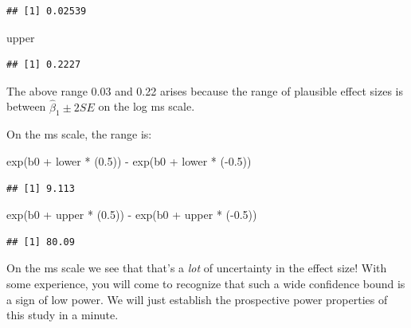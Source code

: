 \documentclass[
  12pt,
]{krantz}
\newenvironment{Shaded}{\begin{snugshade}}{\end{snugshade}}
\newcommand{\FloatTok}[1]{\textcolor[rgb]{0.00,0.00,0.81}{#1}}
\newcommand{\FunctionTok}[1]{\textcolor[rgb]{0.00,0.00,0.00}{#1}}
\newcommand{\NormalTok}[1]{#1}
\newcommand{\SpecialCharTok}[1]{\textcolor[rgb]{0.00,0.00,0.00}{#1}}
\theoremstyle{definition}
\theoremstyle{definition}
\theoremstyle{definition}
\theoremstyle{definition}
\theoremstyle{remark}
\begin{document}
\begin{verbatim}
## [1] 0.02539
\end{verbatim}

\begin{Shaded}
\begin{Highlighting}[]
\NormalTok{upper}
\end{Highlighting}
\end{Shaded}

\begin{verbatim}
## [1] 0.2227
\end{verbatim}

The above range 0.03 and 0.22 arises because the range of plausible effect sizes is between \(\hat\beta_1 \pm 2SE\) on the log ms scale.

On the ms scale, the range is:

\begin{Shaded}
\begin{Highlighting}[]
\FunctionTok{exp}\NormalTok{(b0 }\SpecialCharTok{+}\NormalTok{ lower }\SpecialCharTok{*}\NormalTok{ (}\FloatTok{0.5}\NormalTok{)) }\SpecialCharTok{{-}} \FunctionTok{exp}\NormalTok{(b0 }\SpecialCharTok{+}\NormalTok{ lower }\SpecialCharTok{*}\NormalTok{ (}\SpecialCharTok{{-}}\FloatTok{0.5}\NormalTok{))}
\end{Highlighting}
\end{Shaded}

\begin{verbatim}
## [1] 9.113
\end{verbatim}

\begin{Shaded}
\begin{Highlighting}[]
\FunctionTok{exp}\NormalTok{(b0 }\SpecialCharTok{+}\NormalTok{ upper }\SpecialCharTok{*}\NormalTok{ (}\FloatTok{0.5}\NormalTok{)) }\SpecialCharTok{{-}} \FunctionTok{exp}\NormalTok{(b0 }\SpecialCharTok{+}\NormalTok{ upper }\SpecialCharTok{*}\NormalTok{ (}\SpecialCharTok{{-}}\FloatTok{0.5}\NormalTok{))}
\end{Highlighting}
\end{Shaded}

\begin{verbatim}
## [1] 80.09
\end{verbatim}

On the ms scale we see that that's a \emph{lot} of uncertainty in the effect size! With some experience, you will come to recognize that such a wide confidence bound is a sign of low power. We will just establish the prospective power properties of this study in a minute.
\end{document}
